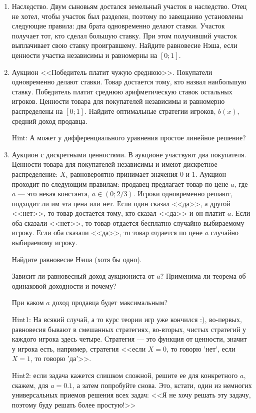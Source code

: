 \begin{enumerate}
\item Наследство. Двум сыновьям достался земельный участок в наследство. Отец не хотел, чтобы участок был разделен, поэтому по завещанию установлены следующие правила: два брата одновременно делают ставки. Участок получает тот, кто сделал большую ставку. При этом получивший участок выплачивает свою ставку проигравшему. Найдите равновесие Нэша, если ценности участка независимы и равномерны на $ [0;1] $.

\item Аукцион <<Победитель платит чужую среднюю>>. Покупатели одновременно делают ставки. Товар достается тому, кто назвал наибольшую ставку. Победитель платит среднюю арифметическую ставок остальных игроков. Ценности товара для покупателей независимы и равномерно распределены на $ [0;1] $. Найдите оптимальные стратегии игроков, $ b(x) $, средний доход продавца.

Hint: А может у дифференциального уравнения простое линейное решение?


\item Аукцион с дискретными ценностями. В аукционе участвуют два покупателя. Ценности товара для покупателей независимы и имеют дискретное распределение: $ X_{i} $ равновероятно принимает значения $ 0 $ и $ 1 $. Аукцион проходит по следующим правилам: продавец предлагает товар по цене $ a $, где $ a $ --- это некая константа, $ a\in (0;2/3) $. Игроки одновременно решают, подходит ли им эта цена или нет. Если один сказал <<да>>, а другой <<нет>>, то товар достается тому, кто сказал <<да>> и он платит $ a $. Если оба сказали <<нет>>, то товар отдается бесплатно случайно выбираемому игроку. Если оба сказали <<да>>, то товар отдается по цене $ a $ случайно выбираемому игроку. 

Найдите равновесие Нэша (хотя бы одно).

Зависит ли равновесный доход аукциониста от $ a $? Применима ли теорема об одинаковой доходности и почему?

При каком $ a $ доход продавца будет максимальным?

Hint1: На всякий случай, а то курс теории игр уже кончился :), во-первых, равновесия бывают в смешанных стратегиях, во-вторых, чистых стратегий у каждого игрока здесь четыре. Стратегия --- это функция от ценности, значит у игрока есть, например, стратегия <<если $ X=0 $, то говорю 'нет', если $ X=1 $, то говорю 'да'>>.

Hint2: если задача кажется слишком сложной, решите ее для конкретного $ a $, скажем, для $ a=0.1 $, а затем попробуйте снова. Это, кстати, один из немногих универсальных приемов решения всех задач: <<Я не хочу решать эту задачу, поэтому буду решать более простую!>>


\end{enumerate}


